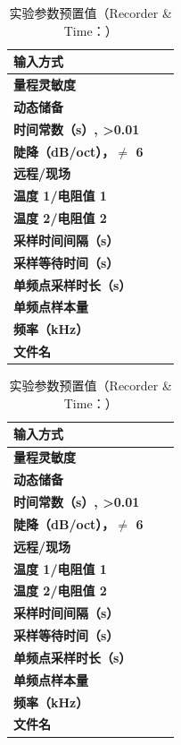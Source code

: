 \begin{table}[h!]
	\centering
	\caption{实验参数预置值（Recorder \& Time：\hspace{4cm}）}
	\label{tab:data2}
	\begin{tabular}{|p{4cm}|p{4cm}|p{4cm}|}
		\hline
		\textbf{输入方式} &  & \\ \hline
		\textbf{量程灵敏度} &  & \\ \hline
		\textbf{动态储备} &  & \\ \hline
		\textbf{时间常数（s）, >0.01} & & \\ \hline
		\textbf{陡降（dB/oct），$\neq$ 6} & & \\ \hline
		\textbf{远程/现场} & & \\ \hline
		\textbf{温度 1/电阻值 1} & & \\ \hline
		\textbf{温度 2/电阻值 2} & & \\ \hline
		\textbf{采样时间间隔（s）} & & \\ \hline
		\textbf{采样等待时间（s）} & & \\ \hline
		\textbf{单频点采样时长（s）} & & \\ \hline
		\textbf{单频点样本量} & & \\ \hline
		\textbf{频率（kHz）} & & \\ \hline
		\textbf{文件名} & & \\ \hline
	\end{tabular}
\end{table}

\begin{table}[h!]
	\centering
	\caption{实验参数预置值（Recorder \& Time：\hspace{4cm}）}
	\label{tab:data3}
	\begin{tabular}{|p{4cm}|p{4cm}|p{4cm}|}
		\hline
		\textbf{输入方式} &  & \\ \hline
		\textbf{量程灵敏度} &  & \\ \hline
		\textbf{动态储备} &  & \\ \hline
		\textbf{时间常数（s）, >0.01} & & \\ \hline
		\textbf{陡降（dB/oct），$\neq$ 6} & & \\ \hline
		\textbf{远程/现场} & & \\ \hline
		\textbf{温度 1/电阻值 1} & & \\ \hline
		\textbf{温度 2/电阻值 2} & & \\ \hline
		\textbf{采样时间间隔（s）} & & \\ \hline
		\textbf{采样等待时间（s）} & & \\ \hline
		\textbf{单频点采样时长（s）} & & \\ \hline
		\textbf{单频点样本量} &  & \\ \hline
		\textbf{频率（kHz）} & & \\ \hline
		\textbf{文件名} & & \\ \hline
	\end{tabular}
\end{table}

